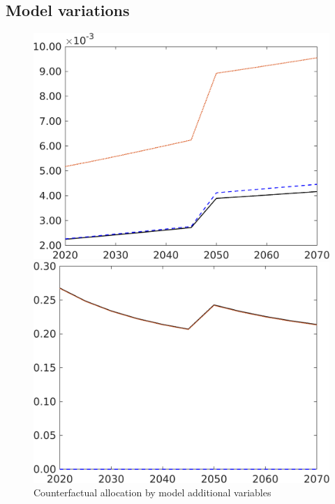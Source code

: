 \subsection{Model variations}
\begin{figure}[h!!]
	\centering
	\caption{Counterfactual allocation by model additional variables }\label{fig:count_mod_allo_app}

\begin{minipage}[]{0.32\textwidth}
	\includegraphics[width=1\textwidth]{../../codding_model/own_basedOnFried/optimalPol_190722_tidiedUp/figures/all_10Aout22/CountMod1_target_Lg_regime3_spillover0_sep1_extern0_PV1_etaa0.79_lgd0.png}
\end{minipage}	\begin{minipage}[]{0.32\textwidth}
		\includegraphics[width=1\textwidth]{../../codding_model/own_basedOnFried/optimalPol_190722_tidiedUp/figures/all_10Aout22/CountMod1_target_sg_regime3_spillover0_sep1_extern0_PV1_etaa0.79_lgd0.png}

\end{minipage}
\end{figure}

